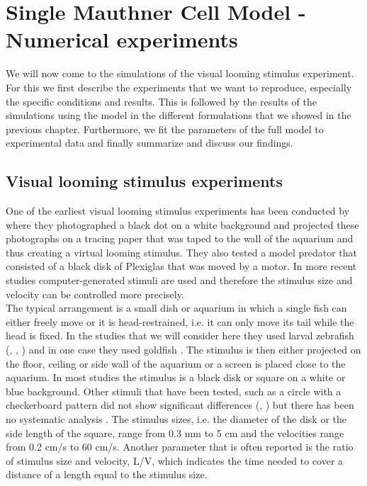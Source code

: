 \chapter{Single Mauthner Cell Model - Numerical experiments}\label{ch:expm}
	We will now come to the simulations of the visual looming stimulus experiment.
	For this we first describe the experiments that we want to reproduce, especially the specific 
	conditions and results.
	This is followed by the results of the simulations using the model in the different 
	formulations that we showed in the previous chapter.
	Furthermore, we fit the parameters of the full model to experimental data and finally summarize 
	and discuss our findings.
	\section{Visual looming stimulus experiments}
	One of the earliest visual looming stimulus experiments has been conducted by 
	\cite{Dill1974} where they photographed a black dot on a white background and projected these 
	photographs on a tracing paper that was taped to the wall of the aquarium and thus creating a virtual looming stimulus.
	They also tested a model predator that consisted of a black disk of Plexiglas that was moved by a motor.
	In more recent studies computer-generated stimuli are used and therefore the stimulus size 
	and velocity can be controlled more precisely.\\
	The typical arrangement is a small dish or aquarium in which a single fish can either freely 
	move or it is head-restrained, i.e. it can only move its tail while the head is fixed. 
	In the studies that we will consider here they used larval zebrafish (\cite{Temizer2015}, 
	\cite{Dunn2016}, \cite{Bhattacharyya2017}) and in one case they used goldfish 
	\citep{Preuss2006}.
	The stimulus is then either projected on the floor, ceiling or side wall of the aquarium or a 
	screen is placed close to the aquarium.
	In most studies the stimulus is a black disk or square on a white or blue background.
	Other stimuli that have been tested, such as a circle with a checkerboard pattern did not show significant differences (\cite{Preuss2006}, \cite{Dunn2016}) but there has been no systematic analysis .
	The stimulus sizes, i.e. the diameter of the disk or the side length of the square, range from 0.3 mm to 5 cm and the velocities range from 0.2 cm/s to 60 cm/s.
    Another parameter that is often reported is the ratio of stimulus size and velocity, L/V, which indicates the time needed to cover a distance of a length equal to the stimulus size.
